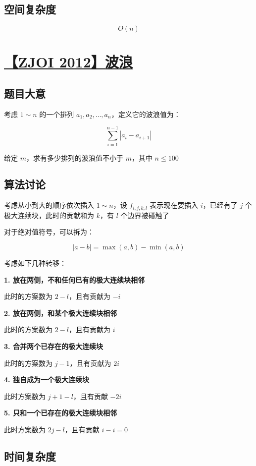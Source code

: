 \documentclass[UTF8]{article}
\begin{document}
\subsection{空间复杂度}

$$
O(n)
$$

\section{\href{https://www.lydsy.com/JudgeOnline/problem.php?id=2817}{【ZJOI 2012】波浪}}

\subsection{题目大意}

考虑 $1 \sim n$ 的一个排列 $a_1,a_2,\dots,a_n$，定义它的波浪值为：

$$
\sum_{i=1}^{n-1} |a_i-a_{i+1}|
$$

给定 $m$，求有多少排列的波浪值不小于 $m$，其中 $n \le 100$

\subsection{算法讨论}

考虑从小到大的顺序依次插入 $1 \sim n$，设 $f_{i,j,k,l}$ 表示现在要插入 $i$，已经有了 $j$ 个极大连续块，此时的贡献和为 $k$，有 $l$ 个边界被碰触了

对于绝对值符号，可以拆为：

$$
|a-b|=\max(a,b)-\min(a,b)
$$

考虑如下几种转移：

\textbf{1. 放在两侧，不和任何已有的极大连续块相邻}

此时的方案数为 $2-l$，且有贡献为 $-i$

\textbf{2. 放在两侧，和某个极大连续块相邻}

此时的方案数为 $2-l$，且有贡献为 $i$

\textbf{3. 合并两个已存在的极大连续块}

此时的方案数为 $j-1$，且有贡献为 $2i$

\textbf{4. 独自成为一个极大连续块}

此时方案数为 $j+1-l$，且有贡献 $-2i$

\textbf{5. 只和一个已存在的极大连续块相邻}

此时方案数为 $2j-l$，且有贡献 $i-i=0$

\subsection{时间复杂度}
\end{document}
